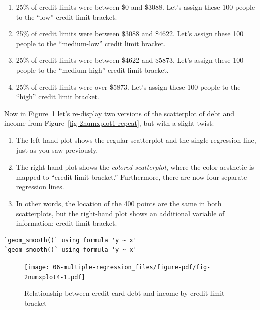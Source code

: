 \documentclass[
  letterpaper,
  DIV=11,
  numbers=noendperiod]{scrreprt}
\providecommand{\tightlist}{%
  \setlength{\itemsep}{0pt}\setlength{\parskip}{0pt}}\usepackage{longtable,booktabs,array}
\theoremstyle{definition}
\theoremstyle{remark}
\begin{document}
\begin{enumerate}
\def\labelenumi{\arabic{enumi}.}
\tightlist
\item
  25\% of credit limits were between \$0 and \$3088. Let's assign these
  100 people to the ``low'' credit limit bracket.
\item
  25\% of credit limits were between \$3088 and \$4622. Let's assign
  these 100 people to the ``medium-low'' credit limit bracket.
\item
  25\% of credit limits were between \$4622 and \$5873. Let's assign
  these 100 people to the ``medium-high'' credit limit bracket.
\item
  25\% of credit limits were over \$5873. Let's assign these 100 people
  to the ``high'' credit limit bracket.
\end{enumerate}

Now in Figure~\ref{fig-2numxplot4} let's re-display two versions of the
scatterplot of debt and income from Figure~\ref{fig-2numxplot1-repeat},
but with a slight twist:

\begin{enumerate}
\def\labelenumi{\arabic{enumi}.}
\tightlist
\item
  The left-hand plot shows the regular scatterplot and the single
  regression line, just as you saw previously.
\item
  The right-hand plot shows the \emph{colored scatterplot}, where the
  color aesthetic is mapped to ``credit limit bracket.'' Furthermore,
  there are now four separate regression lines.
\item
  In other words, the location of the 400 points are the same in both
  scatterplots, but the right-hand plot shows an additional variable of
  information: credit limit bracket.
\end{enumerate}

\begin{verbatim}
`geom_smooth()` using formula 'y ~ x'
`geom_smooth()` using formula 'y ~ x'
\end{verbatim}

\begin{figure}

{\centering \texttt{[image: 06-multiple-regression\_files/figure-pdf/fig-2numxplot4-1.pdf]}

}

\caption{\label{fig-2numxplot4}Relationship between credit card debt and
income by credit limit bracket}

\end{figure}
\end{document}
